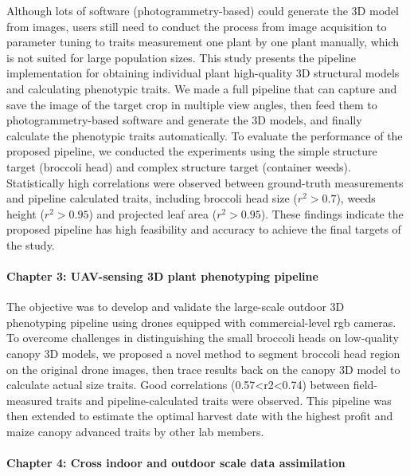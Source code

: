 \begin{eabstract}
  Although lots of software (photogrammetry-based) could generate the 3D model from images, users still need to conduct the process from image acquisition to parameter tuning to traits measurement one plant by one plant manually, which is not suited for large population sizes. This study presents the pipeline implementation for obtaining individual plant high-quality 3D structural models and calculating phenotypic traits. We made a full pipeline that can capture and save the image of the target crop in multiple view angles, then feed them to photogrammetry-based software and generate the 3D models, and finally calculate the phenotypic traits automatically. To evaluate the performance of the proposed pipeline, we conducted the experiments using the simple structure target (broccoli head) and complex structure target (container weeds). Statistically high correlations were observed between ground-truth measurements and pipeline calculated traits, including broccoli head size ($r^2>0.7$), weeds height ($r^2>0.95$) and projected leaf area ($r^2>0.95$). These findings indicate the proposed pipeline has high feasibility and accuracy to achieve the final targets of the study.

 \paragraph{Chapter 3: UAV-sensing 3D plant phenotyping pipeline}

  The objective was to develop and validate the large-scale outdoor 3D phenotyping pipeline using drones equipped with commercial-level \gls{rgb} cameras. To overcome challenges in distinguishing the small broccoli heads on low-quality canopy 3D models, we proposed a novel method to segment broccoli head region on the original drone images, then trace results back on the canopy 3D model to calculate actual size traits. Good correlations (0.57<r2<0.74) between field-measured traits and pipeline-calculated traits were observed.
  This pipeline was then extended to estimate the optimal harvest date with the highest profit and maize canopy advanced traits by other lab members.
  

  \paragraph{Chapter 4: Cross indoor and outdoor scale data assimilation}


\end{eabstract}

